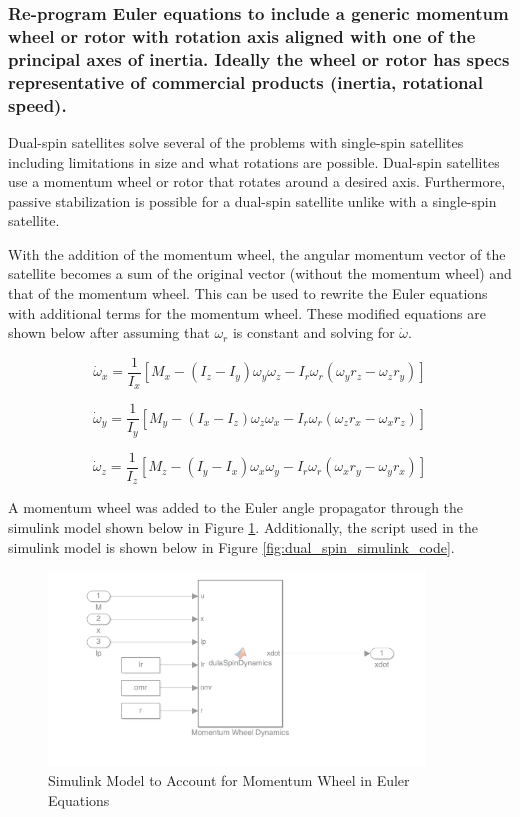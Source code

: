 \subsubsection{Re-program Euler equations to include a generic momentum wheel or rotor with rotation axis
aligned with one of the principal axes of inertia. Ideally the wheel or rotor has specs representative
of commercial products (inertia, rotational speed).}

Dual-spin satellites solve several of the problems with single-spin satellites including limitations in size and what rotations are possible. Dual-spin satellites use a momentum wheel or rotor that rotates around a desired axis. Furthermore, passive stabilization is possible for a dual-spin satellite unlike with a single-spin satellite.

With the addition of the momentum wheel, the angular momentum vector of the satellite becomes a sum of the original vector (without the momentum wheel) and that of the momentum wheel. This can be used to rewrite the Euler equations with additional terms for the momentum wheel. These modified equations are shown below after assuming that $\omega_r$ is constant and solving for $\dot \omega$.

\begin{equation}
\dot \omega_x = \frac{1}{I_x} \left[M_x - (I_z - I_y)\omega_y \omega_z - I_r \omega_r (\omega_y r_z - \omega_z r_y) \right]
\end{equation}

\begin{equation*}
\dot \omega_y = \frac{1}{I_y} \left[M_y - (I_x - I_z)\omega_z \omega_x - I_r \omega_r (\omega_z r_x - \omega_x r_z) \right]
\end{equation*}

\begin{equation*}
\dot \omega_z = \frac{1}{I_z} \left[M_z - (I_y - I_x)\omega_x \omega_y - I_r \omega_r (\omega_x r_y - \omega_y r_x) \right]
\end{equation*}

A momentum wheel was added to the Euler angle propagator through the simulink model shown below in Figure \ref{fig:dual_spin_simulink}. Additionally, the script used in the simulink model is shown below in Figure \ref{fig:dual_spin_simulink_code}.

\begin{figure} [H]
    \centering
    \captionsetup{justification = centering}
    \includegraphics[width = 10cm]{Images/PS4/dualspin_simulink.png}
    \caption{Simulink Model to Account for Momentum Wheel in Euler Equations}
    \label{fig:dual_spin_simulink}
\end{figure}

